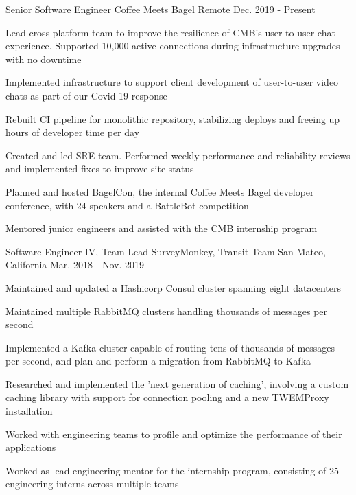 \begin{cventries}
  \cventry
    {Senior Software Engineer}
    {Coffee Meets Bagel}
    {Remote}
    {Dec. 2019 - Present}
    {
        \begin{cvitems}
          \item {Lead cross-platform team to improve the resilience of CMB's user-to-user chat experience. Supported 10,000 active connections during infrastructure upgrades with no downtime}
          \item {Implemented infrastructure to support client development of user-to-user video chats as part of our Covid-19 response}
          \item {Rebuilt CI pipeline for monolithic repository, stabilizing deploys and freeing up hours of developer time per day}
          \item {Created and led SRE team. Performed weekly performance and reliability reviews and implemented fixes to improve site status}
          \item {Planned and hosted BagelCon, the internal Coffee Meets Bagel developer conference, with 24 speakers and a BattleBot competition}
          \item {Mentored junior engineers and assisted with the CMB internship program}
        \end{cvitems}
    }
  \cventry
    {Software Engineer IV, Team Lead}
    {SurveyMonkey, Transit Team}
    {San Mateo, California}
    {Mar. 2018 - Nov. 2019}
    {
      \begin{cvitems}
        \item {Maintained and updated a Hashicorp Consul cluster spanning eight datacenters}
        \item {Maintained multiple RabbitMQ clusters handling thousands of messages per second}
        \item {Implemented a Kafka cluster capable of routing tens of thousands of messages per second, and plan and perform a migration from RabbitMQ to Kafka}
        \item {Researched and implemented the 'next generation of caching', involving a custom caching library with support for connection pooling and a new TWEMProxy installation}
        \item {Worked with engineering teams to profile and optimize the performance of their applications}
        \item {Worked as lead engineering mentor for the internship program, consisting of 25 engineering interns across multiple teams}

\end{cvitems}}
\end{cventries}
